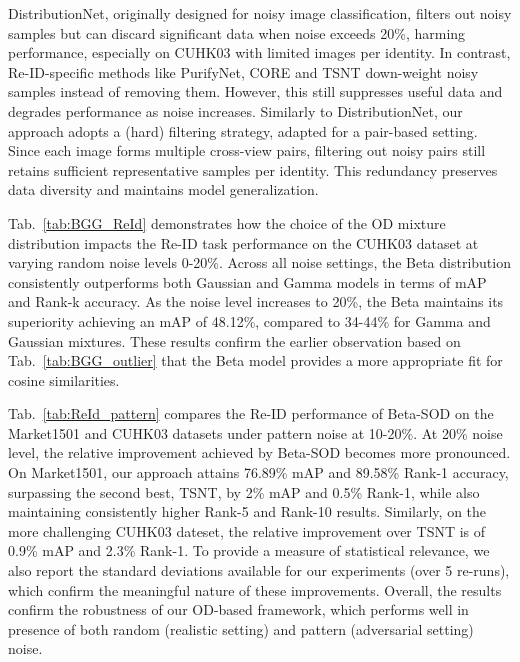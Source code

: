 \documentclass[lettersize,journal]{IEEEtran}
\begin{document}
DistributionNet, originally designed for noisy image classification, filters out noisy samples but can discard significant data when noise exceeds 20\%, harming performance, especially on CUHK03 with limited images per identity. In contrast, Re-ID-specific methods like PurifyNet, CORE and TSNT down-weight noisy samples instead of removing them. However, this still suppresses useful data and degrades performance as noise increases.
Similarly to DistributionNet, our approach adopts a (hard) filtering strategy, adapted for a pair-based setting. Since each image forms multiple cross-view pairs, filtering out noisy pairs still retains sufficient representative samples per identity. This redundancy preserves data diversity and maintains model generalization.

Tab.~\ref{tab:BGG_ReId} demonstrates how the choice of the OD mixture distribution impacts the Re-ID task performance on the CUHK03 dataset at varying random noise levels 0-20\%. Across all noise settings, the Beta distribution consistently outperforms both Gaussian and Gamma models in terms of mAP and Rank-k accuracy. As the noise level increases to 20\%, the Beta maintains its superiority achieving an mAP of 48.12\%, compared to 34-44\% for Gamma and Gaussian mixtures. These results confirm the earlier observation based on Tab.~\ref{tab:BGG_outlier} that the Beta model provides a more appropriate fit for cosine similarities.

Tab.~\ref{tab:ReId_pattern} compares the Re-ID performance of Beta-SOD on the Market1501 and CUHK03 datasets under pattern noise at 10-20\%. 
At 20\% noise level, the relative improvement achieved by Beta-SOD becomes more pronounced. On Market1501, our approach attains 76.89\% mAP and 89.58\% Rank-1 accuracy, surpassing the second best, TSNT, by 2\% mAP and 0.5\% Rank-1, while also maintaining consistently higher Rank-5 and Rank-10 results. Similarly, on the more challenging CUHK03 dateset, the relative improvement over TSNT is of 0.9\% mAP and 2.3\% Rank-1. To provide a measure of statistical relevance, we also report the standard deviations available for our experiments (over 5 re-runs), which confirm the meaningful nature of these improvements.
Overall, the results confirm the robustness of our OD-based framework, which performs well in presence of both random (realistic setting) and pattern (adversarial setting) noise.
\end{document}
